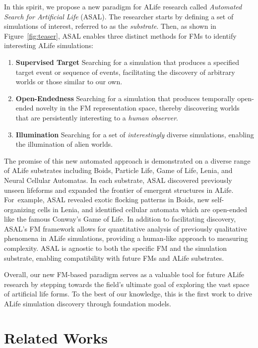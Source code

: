 \documentclass{article}
\begin{document}
In this spirit, we propose a new paradigm for ALife research called \textit{Automated Search for Artificial Life} (ASAL).
The researcher starts by defining a set of simulations of interest, referred to as the \textit{substrate}.
Then, as shown in Figure~\ref{fig:teaser}, ASAL enables three distinct methods for FMs to identify interesting ALife simulations:
\begin{enumerate}
    \item \textbf{Supervised Target }
    Searching for a simulation that produces a specified target event or sequence of events, facilitating the discovery of arbitrary worlds or those similar to our own.
    \item \textbf{Open-Endedness }
    Searching for a simulation that produces temporally open-ended novelty in the FM representation space, thereby discovering worlds that are persistently interesting to a \textit{human observer}.
    \item \textbf{Illumination }
    Searching for a set of \textit{interestingly} diverse simulations, enabling the illumination of alien worlds.
\end{enumerate}



The promise of this new automated approach is demonstrated on a diverse range of ALife substrates including Boids, Particle Life, Game of Life, Lenia, and Neural Cellular Automatas.
In each substrate, ASAL discovered previously unseen lifeforms and expanded the frontier of emergent structures in ALife.
For~example, ASAL revealed exotic flocking patterns in Boids, new self-organizing cells in Lenia, and identified cellular automata which are open-ended like the famous Conway's Game of Life.
In addition to facilitating discovery, ASAL's FM framework allows for quantitative analysis of previously qualitative phenomena in ALife simulations, providing a human-like approach to measuring complexity.
ASAL is agnostic to both the specific FM and the simulation substrate, enabling compatibility with future FMs and ALife substrates.

Overall, our new FM-based paradigm serves as a valuable tool for future ALife research by stepping towards the field's ultimate goal of exploring the vast space of artificial life forms.
To the best of our knowledge, this is the first work to drive ALife simulation discovery through foundation models.


\section{Related Works}
\end{document}

